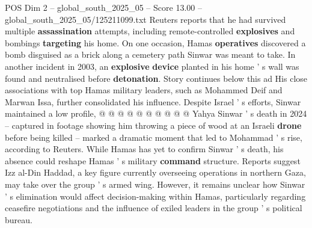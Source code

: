 \begin{textsample}{POS Dim 2 – global\_south\_2025\_05 – Score 13.00 – global\_south\_2025\_05/125211099.txt}
Reuters reports that he had survived multiple \textbf{assassination} attempts, including remote-controlled \textbf{explosives} and bombings \textbf{targeting} his home.
On one occasion, Hamas \textbf{operatives} discovered a bomb disguised as a brick along a cemetery path Sinwar was meant to take.
In another incident in 2003, an \textbf{explosive} \textbf{device} planted in his home ' s wall was found and neutralised before \textbf{detonation}.
Story continues below this ad His close associations with top Hamas military leaders, such as Mohammed Deif and Marwan Issa, further consolidated his influence.
Despite Israel ' s efforts, Sinwar maintained a low profile, @ @ @ @ @ @ @ @ @ @ Yahya Sinwar ' s death in 2024 -- captured in footage showing him throwing a piece of wood at an Israeli \textbf{drone} before being killed -- marked a dramatic moment that led to Mohammad ' s rise, according to Reuters.
While Hamas has yet to confirm Sinwar ' s death, his absence could reshape Hamas ' s military \textbf{command} structure.
Reports suggest Izz al-Din Haddad, a key figure currently overseeing operations in northern Gaza, may take over the group ' s armed wing.
However, it remains unclear how Sinwar ' s elimination would affect decision-making within Hamas, particularly regarding ceasefire negotiations and the influence of exiled leaders in the group ' s political bureau.

\end{textsample}
